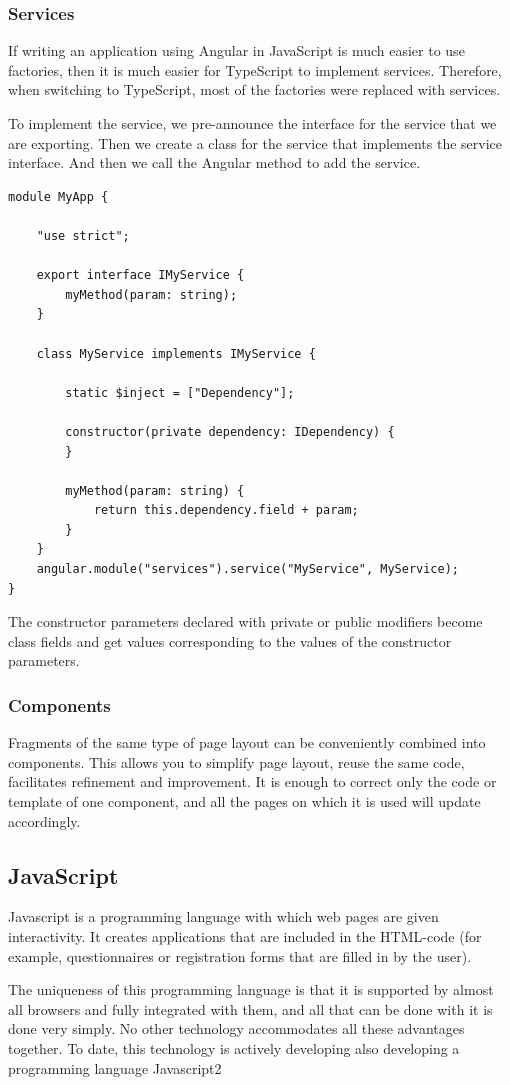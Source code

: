 \subsubsection{Services}
If writing an application using Angular in JavaScript is much easier to use factories, then it is much easier for TypeScript to implement services. Therefore, when switching to TypeScript, most of the factories were replaced with services.\par
To implement the service, we pre-announce the interface for the service that we are exporting. Then we create a class for the service that implements the service interface. And then we call the Angular method to add the service. \cite{Typescript}

\begin{verbatim}
module MyApp {

    "use strict";

    export interface IMyService {
        myMethod(param: string);
    }

    class MyService implements IMyService {

        static $inject = ["Dependency"];

        constructor(private dependency: IDependency) {
        }

        myMethod(param: string) {
            return this.dependency.field + param;
        }
    }
    angular.module("services").service("MyService", MyService);
}
\end{verbatim}

The constructor parameters declared with private or public modifiers become class fields and get values corresponding to the values of the constructor parameters.

\subsubsection{Components}
Fragments of the same type of page layout can be conveniently combined into components. This allows you to simplify page layout, reuse the same code, facilitates refinement and improvement. It is enough to correct only the code or template of one component, and all the pages on which it is used will update accordingly.\cite{Typescript}


\subsection{JavaScript}
Javascript is a programming language with which web pages are given interactivity. It creates applications that are included in the HTML-code (for example, questionnaires or registration forms that are filled in by the user).\par The uniqueness of this programming language is that it is supported by almost all browsers and fully integrated with them, and all that can be done with it is done very simply. No other technology accommodates all these advantages together. To date, this technology is actively developing also developing a programming language Javascript2 \cite{JavaScript}

